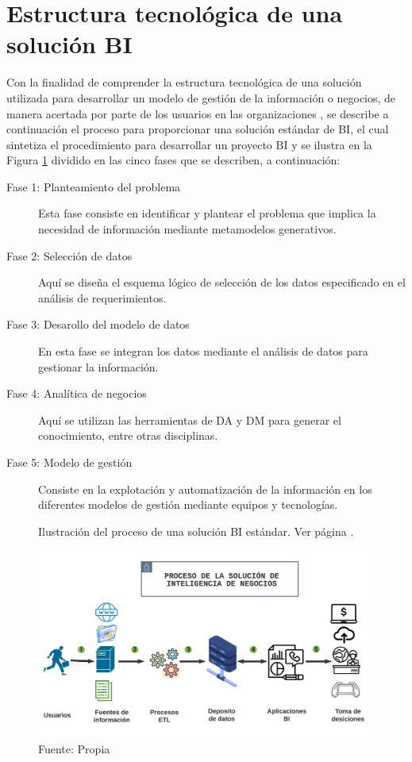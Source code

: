 \documentclass[12pt,jou]{apa7}
\begin{document}
\section{Estructura tecnológica de una solución BI}

Con la finalidad de comprender la estructura tecnológica de una solución utilizada para desarrollar un modelo de gestión de la información o negocios, de manera acertada por parte de los usuarios en las organizaciones \cite{datap}, se describe a continuación el proceso para proporcionar una solución estándar de BI, el cual sintetiza el procedimiento para desarrollar un proyecto BI y se ilustra en la Figura \ref{fig: soluciónBI} dividido en las cinco fases que se describen, a continuación:

\begin{description}
	\item[Fase 1: Planteamiento del problema]  Esta fase consiste en identificar y plantear el problema que implica la necesidad de información mediante metamodelos generativos.
	
	\item[Fase 2: Selección de datos] Aquí se diseña el esquema lógico de selección de los datos especificado en el análisis de requerimientos.
	
	\item[Fase 3: Desarollo del modelo de datos] En esta fase se integran los datos mediante el análisis de datos para gestionar la información.
	
	\item[Fase 4: Analítica de negocios] Aquí se utilizan las herramientas de DA y DM para generar el conocimiento, entre otras disciplinas.
	
	\item[Fase 5: Modelo de gestión] Consiste en la explotación y automatización de la información en los diferentes modelos de gestión mediante equipos y tecnologías.
	
\end{description}
\begin{figure}[h]
\caption{Ilustración del proceso de una solución BI estándar. Ver página \pageref{soluBI}.}
\centering
\includegraphics[width=1\linewidth]{Figuras/soluBI}
\caption*{ Fuente: Propia}
\label{fig: soluciónBI}
\end{figure}
\end{document}
